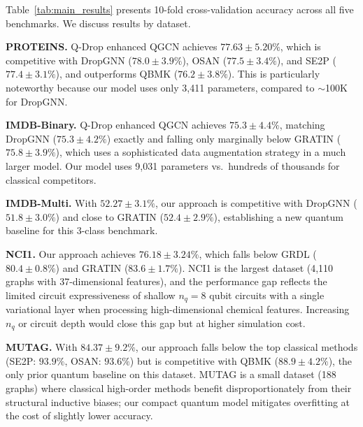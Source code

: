\documentclass[journal]{IEEEtran}
\begin{document}
Table~\ref{tab:main_results} presents 10-fold cross-validation accuracy
across all five benchmarks. We discuss results by dataset.

\textbf{PROTEINS.} Q-Drop enhanced QGCN achieves $77.63 \pm 5.20\%$,
which is competitive with DropGNN ($78.0 \pm 3.9\%$), OSAN ($77.5 \pm
3.4\%$), and SE2P ($77.4 \pm 3.1\%$), and outperforms QBMK ($76.2 \pm
3.8\%$). This is particularly noteworthy because our model uses only
3,411 parameters, compared to $\sim$100K for DropGNN.

\textbf{IMDB-Binary.} Q-Drop enhanced QGCN achieves $75.3 \pm 4.4\%$,
matching DropGNN ($75.3 \pm 4.2\%$) exactly and falling only marginally
below GRATIN ($75.8 \pm 3.9\%$), which uses a sophisticated data
augmentation strategy in a much larger model. Our model uses 9,031
parameters vs.\ hundreds of thousands for classical competitors.

\textbf{IMDB-Multi.} With $52.27 \pm 3.1\%$, our approach is competitive
with DropGNN ($51.8 \pm 3.0\%$) and close to GRATIN ($52.4 \pm 2.9\%$),
establishing a new quantum baseline for this 3-class benchmark.

\textbf{NCI1.} Our approach achieves $76.18 \pm 3.24\%$, which falls
below GRDL ($80.4 \pm 0.8\%$) and GRATIN ($83.6 \pm 1.7\%$). NCI1 is
the largest dataset (4,110 graphs with 37-dimensional features), and the
performance gap reflects the limited circuit expressiveness of shallow
$n_q = 8$ qubit circuits with a single variational layer when processing
high-dimensional chemical features. Increasing $n_q$ or circuit depth
would close this gap but at higher simulation cost.

\textbf{MUTAG.} With $84.37 \pm 9.2\%$, our approach falls below the
top classical methods (SE2P: $93.9\%$, OSAN: $93.6\%$) but is competitive
with QBMK ($88.9 \pm 4.2\%$), the only prior quantum baseline on this
dataset. MUTAG is a small dataset (188 graphs) where classical high-order
methods benefit disproportionately from their structural inductive biases;
our compact quantum model mitigates overfitting at the cost of slightly
lower accuracy.
\end{document}
